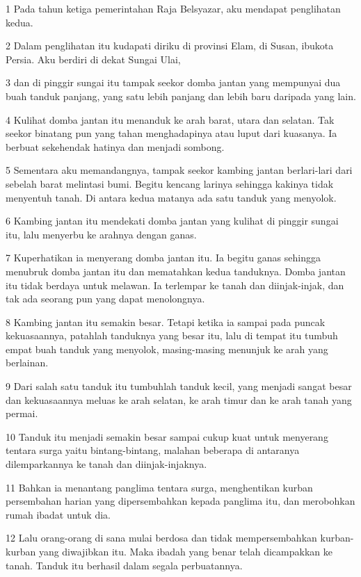 \par 1 Pada tahun ketiga pemerintahan Raja Belsyazar, aku mendapat penglihatan kedua.
\par 2 Dalam penglihatan itu kudapati diriku di provinsi Elam, di Susan, ibukota Persia. Aku berdiri di dekat Sungai Ulai,
\par 3 dan di pinggir sungai itu tampak seekor domba jantan yang mempunyai dua buah tanduk panjang, yang satu lebih panjang dan lebih baru daripada yang lain.
\par 4 Kulihat domba jantan itu menanduk ke arah barat, utara dan selatan. Tak seekor binatang pun yang tahan menghadapinya atau luput dari kuasanya. Ia berbuat sekehendak hatinya dan menjadi sombong.
\par 5 Sementara aku memandangnya, tampak seekor kambing jantan berlari-lari dari sebelah barat melintasi bumi. Begitu kencang larinya sehingga kakinya tidak menyentuh tanah. Di antara kedua matanya ada satu tanduk yang menyolok.
\par 6 Kambing jantan itu mendekati domba jantan yang kulihat di pinggir sungai itu, lalu menyerbu ke arahnya dengan ganas.
\par 7 Kuperhatikan ia menyerang domba jantan itu. Ia begitu ganas sehingga menubruk domba jantan itu dan mematahkan kedua tanduknya. Domba jantan itu tidak berdaya untuk melawan. Ia terlempar ke tanah dan diinjak-injak, dan tak ada seorang pun yang dapat menolongnya.
\par 8 Kambing jantan itu semakin besar. Tetapi ketika ia sampai pada puncak kekuasaannya, patahlah tanduknya yang besar itu, lalu di tempat itu tumbuh empat buah tanduk yang menyolok, masing-masing menunjuk ke arah yang berlainan.
\par 9 Dari salah satu tanduk itu tumbuhlah tanduk kecil, yang menjadi sangat besar dan kekuasaannya meluas ke arah selatan, ke arah timur dan ke arah tanah yang permai.
\par 10 Tanduk itu menjadi semakin besar sampai cukup kuat untuk menyerang tentara surga yaitu bintang-bintang, malahan beberapa di antaranya dilemparkannya ke tanah dan diinjak-injaknya.
\par 11 Bahkan ia menantang panglima tentara surga, menghentikan kurban persembahan harian yang dipersembahkan kepada panglima itu, dan merobohkan rumah ibadat untuk dia.
\par 12 Lalu orang-orang di sana mulai berdosa dan tidak mempersembahkan kurban-kurban yang diwajibkan itu. Maka ibadah yang benar telah dicampakkan ke tanah. Tanduk itu berhasil dalam segala perbuatannya.
